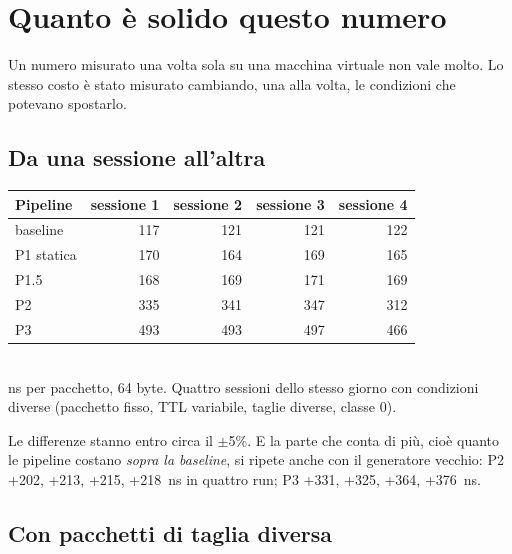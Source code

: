 \documentclass[11pt,a4paper,oneside]{report}
\begin{document}
\section{Quanto è solido questo numero}

Un numero misurato una volta sola su una macchina virtuale non vale molto. Lo
stesso costo è stato misurato cambiando, una alla volta, le condizioni che
potevano spostarlo.

\subsection*{Da una sessione all'altra}

\begin{center}
\small
\begin{tabular}{@{}lrrrr@{}}
\toprule
\textbf{Pipeline} & \textbf{sessione 1} & \textbf{sessione 2} & \textbf{sessione 3}
& \textbf{sessione 4} \\
\midrule
baseline   & 117 & 121 & 121 & 122 \\
P1 statica & 170 & 164 & 169 & 165 \\
P1.5       & 168 & 169 & 171 & 169 \\
P2         & 335 & 341 & 347 & 312 \\
P3         & 493 & 493 & 497 & 466 \\
\bottomrule
\end{tabular}\\[2pt]
{\footnotesize\color{soft} ns per pacchetto, 64 byte. Quattro sessioni dello stesso giorno con
condizioni diverse (pacchetto fisso, TTL variabile, taglie diverse, classe 0).}
\end{center}

Le differenze stanno entro circa il $\pm$5\%. E la parte che conta di più, cioè
quanto le pipeline costano \emph{sopra la baseline}, si ripete anche con il
generatore vecchio: P2 +202, +213, +215, +218~ns in quattro run; P3 +331, +325,
+364, +376~ns.

\subsection*{Con pacchetti di taglia diversa}
\end{document}
